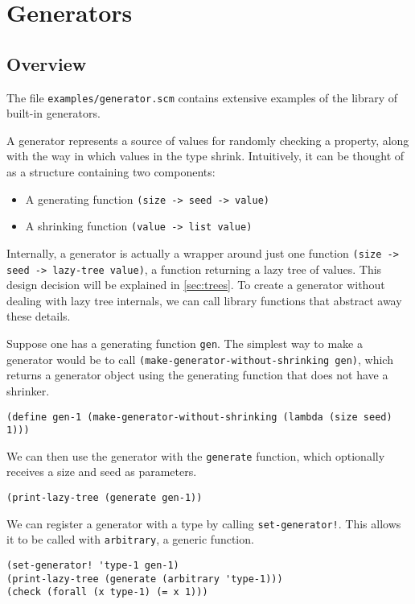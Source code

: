 \documentclass{scrartcl}
\begin{document}
\section{Generators}\label{sec:generators}
\subsection{Overview}

The file \verb|examples/generator.scm| contains extensive examples of the
library of built-in generators.

A generator represents a source of values for randomly checking a property,
along with the way in which values in the type shrink.
Intuitively, it can be thought of as a structure containing two components:
\begin{itemize}
\item A generating function \verb|(size -> seed -> value)|
\item A shrinking function \verb|(value -> list value)|
\end{itemize}
Internally, a generator is actually a wrapper around just one function
\verb|(size -> seed -> lazy-tree value)|, a function returning a lazy tree of
values. This design decision will be explained in
\cref{sec:trees}.
To create a generator without dealing with lazy tree internals,
we can call library functions that abstract away these details.

Suppose one has a generating function \verb|gen|. The simplest way to make a
generator would be to call \verb|(make-generator-without-shrinking gen)|,
which returns a generator object using the generating function that does not
have a shrinker.
\begin{verbatim}
(define gen-1 (make-generator-without-shrinking (lambda (size seed) 1)))
\end{verbatim}

We can then use the generator with the \verb|generate| function,
which optionally receives a size and seed as parameters.
\begin{verbatim}
(print-lazy-tree (generate gen-1))
\end{verbatim}

We can register a generator with a type by calling \verb|set-generator!|. This
allows it to be called with \verb|arbitrary|, a generic function.

\begin{verbatim}
(set-generator! 'type-1 gen-1)
(print-lazy-tree (generate (arbitrary 'type-1)))
(check (forall (x type-1) (= x 1)))
\end{verbatim}
\end{document}
